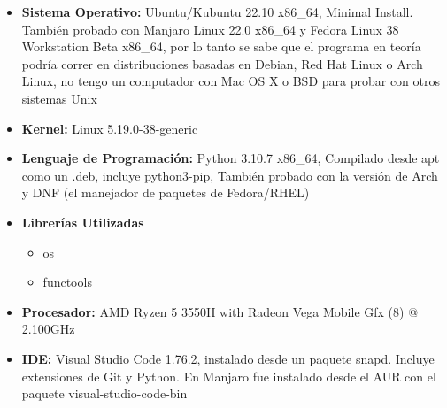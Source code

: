 \documentclass[a4paper]{article}
\begin{document}
\begin{itemize}
    \item \textbf{Sistema Operativo: } Ubuntu/Kubuntu 22.10 x86\_64, Minimal Install. También probado con Manjaro Linux 22.0 x86\_64 y Fedora
    Linux 38 Workstation Beta x86\_64, por lo tanto se sabe que el programa en teoría podría correr en distribuciones basadas en Debian,
    Red Hat Linux o Arch Linux, no tengo un computador con Mac OS X o BSD para probar con otros sistemas Unix
    \item \textbf{Kernel: }Linux 5.19.0-38-generic
    \item \textbf{Lenguaje de Programación: }Python 3.10.7 x86\_64, Compilado desde apt como un .deb, incluye python3-pip,
    También probado con la versión de Arch y DNF (el manejador de paquetes de Fedora/RHEL)
    \item \textbf{Librerías Utilizadas}
    \begin{itemize}
        \item os
        \item functools
    \end{itemize}
    \item \textbf{Procesador: }AMD Ryzen 5 3550H with Radeon Vega Mobile Gfx (8) @ 2.100GHz 
    \item \textbf{IDE: } Visual Studio Code 1.76.2, instalado desde un paquete snapd. Incluye extensiones
    de Git y Python. En Manjaro fue instalado desde el AUR con el paquete visual-studio-code-bin
\end{itemize}
\end{document}
